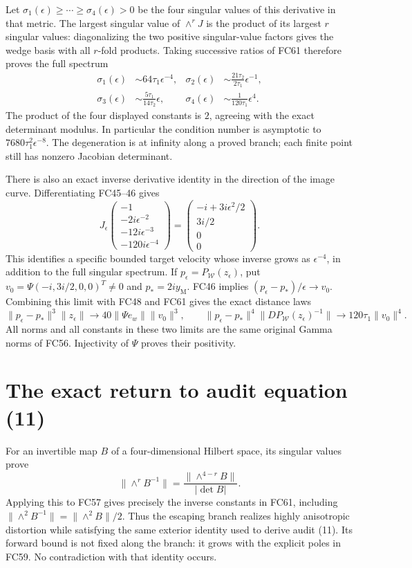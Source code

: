 \documentclass[11pt]{article}
\begin{document}
Let $\sigma_1(\epsilon)\ge\cdots\ge\sigma_4(\epsilon)>0$
be the four singular values of this derivative in that metric. The
largest singular value of $\wedge^r J$ is the product of its largest
$r$ singular values: diagonalizing the two positive singular-value
factors gives the wedge basis with all $r$-fold products. Taking
successive ratios of FC61 therefore proves the full spectrum
\[
\begin{aligned}
 \sigma_1(\epsilon)&\sim64\tau_1\epsilon^{-4},&
 \sigma_2(\epsilon)&\sim\frac{21\tau_2}{2\tau_1}\epsilon^{-1},\\
 \sigma_3(\epsilon)&\sim\frac{5\tau_1}{14\tau_2}\epsilon,&
 \sigma_4(\epsilon)&\sim\frac{1}{120\tau_1}\epsilon^4.
\end{aligned}\tag{FC62}
\]
The product of the four displayed constants is $2$, agreeing with
the exact determinant modulus. In particular the condition number
is asymptotic to $7680\tau_1^2\epsilon^{-8}$. The degeneration is
at infinity along a proved branch; each finite point still has
nonzero Jacobian determinant.

There is also an exact inverse derivative identity in the direction
of the image curve. Differentiating FC45--46 gives
\[
 J_\epsilon
 \begin{pmatrix}-1\\-2i\epsilon^{-2}\\-12i\epsilon^{-3}\\-120i\epsilon^{-4}\end{pmatrix}
 =\begin{pmatrix}-i+3i\epsilon^2/2\\3i/2\\0\\0\end{pmatrix}.
 \tag{FC63}
\]
This identifies a specific bounded target velocity whose inverse
grows as $\epsilon^{-4}$, in addition to the full singular spectrum.
If $p_\epsilon=P_{\mathcal W}(z_\epsilon)$, put
$v_0=\Psi(-i,3i/2,0,0)^T\ne0$ and $p_*=2iy_{\mathrm M}$.
FC46 implies $(p_\epsilon-p_*)/\epsilon\to v_0$. Combining
this limit with FC48 and FC61 gives the exact distance laws
\[
 \|p_\epsilon-p_*\|^3\|z_\epsilon\|
       \longrightarrow40\|\Psi e_w\|\|v_0\|^3,
 \qquad
 \|p_\epsilon-p_*\|^4
 \|DP_{\mathcal W}(z_\epsilon)^{-1}\|
       \longrightarrow120\tau_1\|v_0\|^4.
 \tag{FC64}
\]
All norms and all constants in these two limits are the same original
Gamma norms of FC56. Injectivity of $\Psi$ proves their positivity.

\section{The exact return to audit equation (11)}
For an invertible map $B$ of a four-dimensional Hilbert space,
its singular values prove
\[
 \|\wedge^r B^{-1}\|=
       \frac{\|\wedge^{4-r}B\|}{|\det B|}.
 \tag{FC65}
\]
Applying this to FC57 gives precisely the inverse constants in FC61,
including $\|\wedge^2 B^{-1}\|=\|\wedge^2B\|/2$.
Thus the escaping branch realizes highly anisotropic distortion while
satisfying the same exterior identity used to derive audit (11).
Its forward bound is not fixed along the branch: it grows with the
explicit poles in FC59. No contradiction with that identity occurs.
\end{document}
